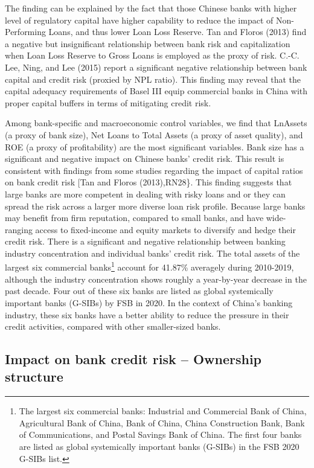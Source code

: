 \documentclass{article}
\begin{document}
The finding can be explained by the fact that those Chinese banks with
higher level of regulatory capital have higher capability to reduce the
impact of Non-Performing Loans, and thus lower Loan Loss Reserve. Tan
and Floros (2013) find a negative but insignificant relationship between
bank risk and capitalization when Loan Loss Reserve to Gross Loans is
employed as the proxy of risk. C.-C. Lee, Ning, and Lee (2015) report a
significant negative relationship between bank capital and credit risk
(proxied by NPL ratio). This finding may reveal that the capital
adequacy requirements of Basel III equip commercial banks in China with
proper capital buffers in terms of mitigating credit risk.

Among bank-specific and macroeconomic control variables, we find that
LnAssets (a proxy of bank size), Net Loans to Total Assets (a proxy of
asset quality), and ROE (a proxy of profitability) are the most
significant variables. Bank size has a significant and negative impact
on Chinese banks' credit risk. This result is consistent with findings
from some studies regarding the impact of capital ratios on bank credit
risk {[}Tan and Floros (2013),RN28\}. This finding suggests that large
banks are more competent in dealing with risky loans and or they can
spread the risk across a larger more diverse loan risk profile. Because
large banks may benefit from firm reputation, compared to small banks,
and have wide-ranging access to fixed-income and equity markets to
diversify and hedge their credit risk. There is a significant and
negative relationship between banking industry concentration and
individual banks' credit risk. The total assets of the largest six
commercial banks\footnote{The largest six commercial banks: Industrial
  and Commercial Bank of China, Agricultural Bank of China, Bank of
  China, China Construction Bank, Bank of Communications, and Postal
  Savings Bank of China. The first four banks are listed as global
  systemically important banks (G-SIBs) in the FSB 2020 G-SIBs list.}
account for 41.87\% averagely during 2010-2019, although the industry
concentration shows roughly a year-by-year decrease in the past decade.
Four out of these six banks are listed as global systemically important
banks (G-SIBs) by FSB in 2020. In the context of China's banking
industry, these six banks have a better ability to reduce the pressure
in their credit activities, compared with other smaller-sized banks.

\hypertarget{impact-on-bank-credit-risk-ownership-structure}{%
\subsection{Impact on bank credit risk -- Ownership
structure}\label{impact-on-bank-credit-risk-ownership-structure}}
\end{document}
